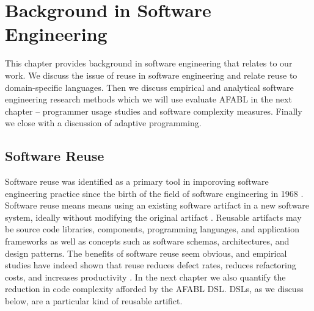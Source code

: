 \chapter{Background in Software Engineering}\label{ch:se}

This chapter provides background in software engineering that relates to our work. We discuss the issue of reuse in software engineering and relate reuse to domain-specific languages. Then we discuss empirical and analytical software engineering research methods which we will use evaluate AFABL in the next chapter -- programmer usage studies and software complexity measures. Finally we close with a discussion of adaptive programming.

\section{Software Reuse}

Software reuse was identified as a primary tool in imporoving software engineering practice since the birth of the field of software engineering in 1968 \cite{mcilroy1968mass}. Software reuse means means using an existing software artifact in a new software system, ideally without modifying the original artifact \cite{krueger1992a-software,frakes2005a-software}. Reusable artifacts may be source code libraries, components, programming languages, and application frameworks \cite{polancic2010a-an-empirical} as well as concepts such as software schemas, architectures, and design patterns. The benefits of software reuse seem obvious, and empirical studies have indeed shown that reuse reduces defect rates, reduces refactoring costs, and increases productivity \cite{basili1996a-how-reuse,mohagheghi2008a-an-empirical}. In the next chapter we also quantify the reduction in code complexity afforded by the AFABL DSL. DSLs, as we discuss below, are a particular kind of reusable artifict.

